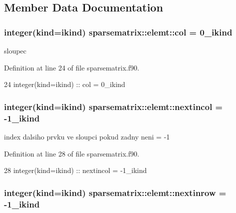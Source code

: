 \subsection{Member Data Documentation}
\subsubsection[{col}]{\setlength{\rightskip}{0pt plus 5cm}integer(kind=ikind) sparsematrix\+::elemt\+::col = 0\+\_\+ikind}\label{structsparsematrix_1_1elemt_a08b9e18e626908a699d7b3522c7ba2e3}


sloupec 



Definition at line 24 of file sparsematrix.\+f90.


\begin{DoxyCode}
24         \textcolor{keywordtype}{integer(kind=ikind)} :: col = 0\_ikind
\end{DoxyCode}
\subsubsection[{nextincol}]{\setlength{\rightskip}{0pt plus 5cm}integer(kind=ikind) sparsematrix\+::elemt\+::nextincol = -\/1\+\_\+ikind}\label{structsparsematrix_1_1elemt_a0b1ed3db0a871a2d2244b1c2c5f0e69c}


index dalsiho prvku ve sloupci pokud zadny neni = -\/1 



Definition at line 28 of file sparsematrix.\+f90.


\begin{DoxyCode}
28         \textcolor{keywordtype}{integer(kind=ikind)} :: nextincol = -1\_ikind
\end{DoxyCode}
\subsubsection[{nextinrow}]{\setlength{\rightskip}{0pt plus 5cm}integer(kind=ikind) sparsematrix\+::elemt\+::nextinrow = -\/1\+\_\+ikind}\label{structsparsematrix_1_1elemt_a86a511afffb53d189cc1bf8b6bbf395e}


